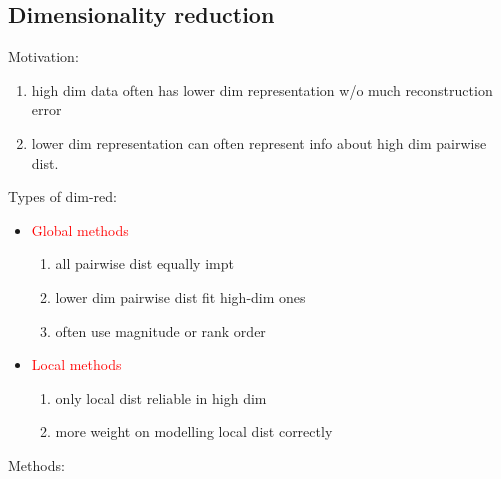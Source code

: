 \documentclass[font=12pt]{article}
\begin{document}
\subsection{Dimensionality reduction}
Motivation:
\begin{enumerate}
	\item high dim data often has lower dim representation w/o much reconstruction error
	\item lower dim representation can often represent info about high dim pairwise dist.
\end{enumerate}
Types of dim-red:
\begin{itemize}
	\item \textcolor{red}{Global methods}
		\begin{enumerate}
			\item all pairwise dist equally impt
			\item lower dim pairwise dist fit high-dim ones
			\item often use magnitude or rank order
		\end{enumerate}
	\item \textcolor{red}{Local methods}
		\begin{enumerate}
			\item only local dist reliable in high dim
			\item more weight on modelling local dist correctly
		\end{enumerate}
\end{itemize}
Methods:
\end{document}
